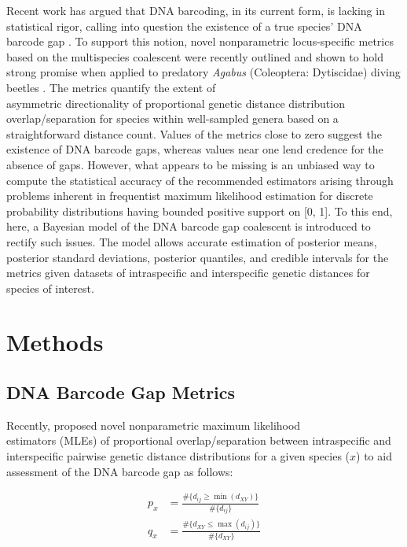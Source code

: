 \documentclass[12pt]{article}
\begin{document}
Recent work has argued that DNA barcoding, in its current form, is lacking in statistical rigor, calling into question the existence of a true species' DNA barcode gap \cite{phillips2022lack}. To support this notion, novel nonparametric locus-specific metrics based on the multispecies coalescent \citep{rannala2003bayes, yang2017bayesian} were recently outlined and shown to hold strong promise when applied to predatory \textit{Agabus} (Coleoptera: Dytiscidae) diving beetles \citep{phillips2024measure}. The metrics quantify the extent of \\ asymmetric directionality of proportional genetic distance distribution overlap/separation for species within well-sampled genera based on a straightforward distance count. Values of the metrics close to zero suggest the existence of DNA barcode gaps, whereas values near one lend credence for the absence of gaps. However, what appears to be missing is an unbiased way to compute the statistical accuracy of the recommended estimators arising through problems inherent in frequentist maximum likelihood estimation for discrete probability distributions having bounded positive support on [0, 1]. To this end, here, a Bayesian model of the DNA barcode gap coalescent is introduced to rectify such issues. The model allows accurate estimation of posterior means, posterior standard deviations, posterior quantiles, and credible intervals for the metrics given datasets of intraspecific and interspecific genetic distances for species of interest.


\section{Methods}

\subsection{DNA Barcode Gap Metrics}

Recently, \citet{phillips2024measure} proposed novel nonparametric maximum likelihood \\ estimators (MLEs) of proportional overlap/separation between intraspecific and interspecific pairwise genetic distance distributions for a given species ($x$) to aid assessment of the DNA barcode gap as follows:

\begin{align}
p_x &= \frac{\#\{d_{ij} \geq \min(d_{XY})\}}{\#\{d_{ij}\}} \\[1mm]
q_x &= \frac{\#\{d_{XY} \leq \max(d_{ij})\}}{\#\{d_{XY}\}}
\end{align}
\end{document}
